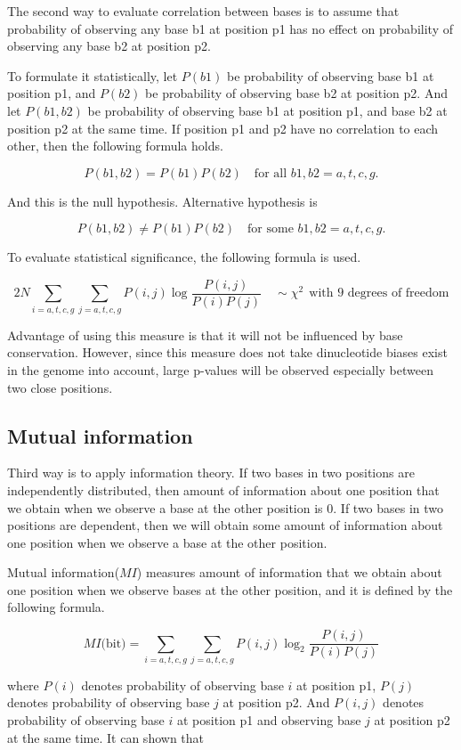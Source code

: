 The second way to evaluate correlation between bases is to assume that
probability of observing any base b1 at position p1 has no effect on
probability of observing any base b2 at position p2.

To formulate it statistically, let \(P(b1)\) be probability of
observing base b1 at position p1, and \(P(b2)\) be probability of
observing base b2 at position p2. And let \(P(b1, b2)\) be probability
of observing base b1 at position p1, and base b2 at position p2 at the
same time. If position p1 and p2 have no correlation to each other,
then the following formula holds.

\[ P(b1, b2) = P(b1)P(b2) \quad \mbox{for all } b1,b2=a,t,c,g. \]


And this is the null hypothesis. Alternative hypothesis is

\[ P(b1, b2) \neq P(b1)P(b2) \quad \mbox{for some }b1,b2=a,t,c,g. \]

To evaluate statistical significance, the following formula is used.

\[
2N\sum_{i=a,t,c,g}\sum_{j=a,t,c,g}
                  P(i,j)\log\frac{P(i,j)}{P(i)P(j)} \quad \sim \chi^{2} \:\: \mbox{with 9 degrees of freedom}
\]

Advantage of using this measure is that it will not be influenced by
base conservation. However, since this measure does not take
dinucleotide biases exist in the genome into account, large p-values
will be observed especially between two close positions.

\subsection{Mutual information}

Third way is to apply information theory. If two bases in two
positions are independently distributed, then amount of information
about one position that we obtain when we observe a base at the other
position is 0. If two bases in two positions are dependent, then we
will obtain some amount of information about one position when we
observe a base at the other position.

Mutual information(\(MI\)) measures amount of information that we obtain about
one position when we observe bases at the other position, and it is
defined by the following formula.

\[
MI\mbox{(bit)} = \sum_{i=a,t,c,g}\sum_{j=a,t,c,g}P(i,j)\log_{2}\frac{P(i,j)}{P(i)P(j)}
\]

\noindent
where \(P(i)\) denotes probability of observing base \(i\) at position
p1, \(P(j)\) denotes probability of observing base \(j\) at position
p2. And \(P(i,j)\) denotes probability of observing base \(i\) at
position p1 and observing base \(j\) at position p2 at the same time.
It can shown that

